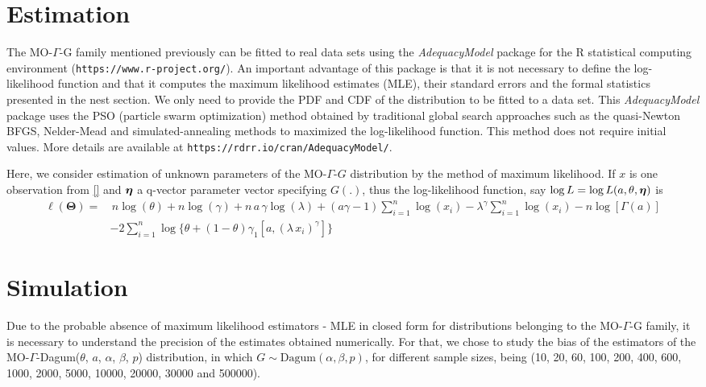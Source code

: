 \documentclass[12pt,a4paper]{article} %
\newcommand{\etn}{{\mbox{\boldmath $\eta$}}}
\begin{document}
\section{Estimation}\label{estimation}

The  MO-$\Gamma$-G family mentioned previously can be  fitted to real data sets using the {\it AdequacyModel}
package for the {\sf R} statistical computing environment ({\tt https://www.r-project.org/}).
An important advantage of this packa\-ge is that it is not necessary to define
the log-likelihood function and that it computes the maximum likelihood estimates (MLE), their standard errors and the formal statistics
presented in the nest section. We only need to provide the PDF and CDF of the distribution to be fitted to a data set.
This {\it AdequacyModel} package uses the PSO (particle swarm optimization) method obtained by traditional global search approaches
such as the quasi-Newton BFGS, Nelder-Mead and simulated-annealing methods to maximized the log-likelihood function. This
method does not require initial values. More
details are available at {\tt https://rdrr.io/cran/AdequacyModel/}.

Here, we consider estimation of unknown parameters of the MO-$\Gamma$-$G$ distribution by the method of maximum likelihood. If $x$ is one observation from \ref{} and $\etn$ a q-vector parameter vector specifying $G(.)$, thus the log-likelihood function, say $\log L=\log L(a,\theta,\etn)$ is
\begin{align}\ell (\boldsymbol{\Theta})=&\,n\log (\theta)+n\log(\gamma)+n\, a\, \gamma \log(\lambda)+(a\gamma-1)\sum_{i=1}^n{\log(x_i)}-\lambda^\gamma\sum_{i=1}^n{\log(x_i)}-n\log[\Gamma(a)] \nonumber \\ & -2\sum_{i=1}^n{\log\{\theta+(1-\theta)\gamma_1[a,(\lambda\,x_i)^\gamma]\}}
\end{align}

\section{Simulation}\label{sec:simulation}

Due to the probable absence of maximum likelihood estimators - MLE in closed form for distributions belonging to the MO-$\Gamma $-G family, it is necessary to understand the precision of the estimates obtained numerically. For that, we chose to study the bias of the estimators of the MO-$\Gamma$-Dagum($\theta$, $a$, $\alpha$, $\beta$, $p$) distribution, in which $ G \sim \mathrm {Dagum} (\alpha, \beta, p) $, for different sample sizes, being (10, 20, 60, 100, 200, 400, 600, 1000, 2000, 5000, 10000, 20000, 30000 and 500000).
\end{document}
